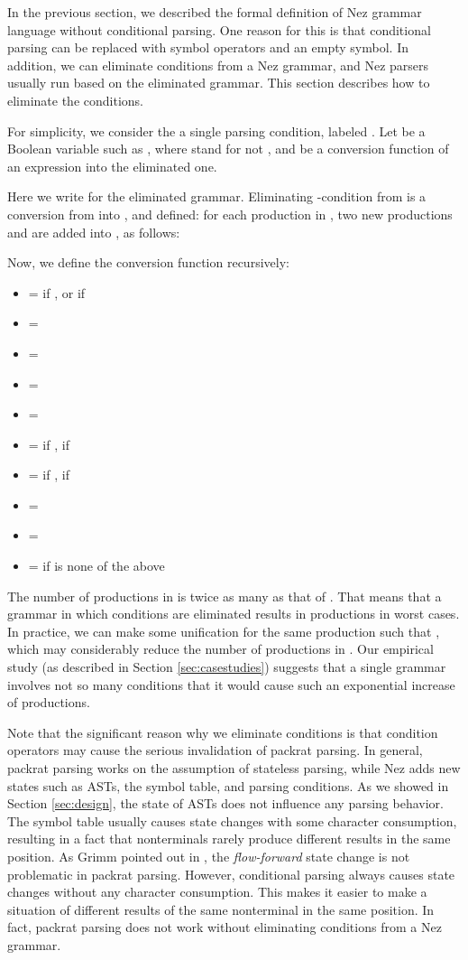 \documentclass[preprint]{sigplanconf}
\begin{document}
{{{In the previous section, we described the formal definition of Nez grammar language without conditional parsing. One reason for this is that conditional parsing can be replaced with symbol operators and an empty symbol.  In addition, we can eliminate conditions from a Nez grammar, and Nez parsers usually run based on the eliminated grammar. This section describes how to eliminate the conditions.

For simplicity, we consider the a single parsing condition, labeled . Let  be a Boolean variable such as , where  stand for not , and  be a conversion function of an expression  into the eliminated one. 

Here we write  for the eliminated grammar. Eliminating -condition from  is a conversion from  into , and defined: for each production  in , two new productions  and  are added into , as follows:



Now, we define the conversion function  recursively:

\begin{itemize}
\item  =  if , or  if 
\item  = 
\item  = 
\item  = 
\item  = 
\item  =  if ,  if 
\item  =  if ,  if 
\item  = 
\item  =  
\item  =  if  is none of the above
\end{itemize}

The number of productions in  is twice as many as that of . That means that a grammar in which  conditions are eliminated results in  productions in worst cases. 
In practice, we can make some unification for the same production such that , which may considerably reduce the number of productions in . Our empirical study (as described in Section \ref{sec:casestudies}) suggests that a single grammar involves not so many conditions that it would cause such an exponential increase of productions.

Note that the significant reason why we eliminate conditions is that condition operators may cause the serious invalidation of packrat parsing. In general, packrat parsing works on the assumption of stateless parsing\cite{ICFP02_PackratParsing}, while Nez adds new states such as ASTs, the symbol table, and parsing conditions. As we showed in Section \ref{sec:design}, the state of  ASTs does not influence any parsing behavior. The symbol table usually causes state changes with some character consumption, resulting in a fact that nonterminals rarely produce different results in the same position. As Grimm pointed out in \cite{PLDI06_Rats}, the {\em flow-forward} state change is not problematic in packrat parsing.  However, conditional parsing always causes state changes without any character consumption. This makes it easier to make a situation of different results of the same nonterminal in the same position. In fact, packrat parsing does not work without eliminating conditions from a Nez grammar. 

}}}
\end{document}
